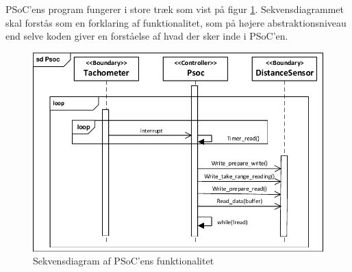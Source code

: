PSoC'ens program fungerer i store træk som vist på figur \ref{fig:sd_main_psoc}. Sekvensdiagrammet skal forstås som en forklaring af funktionalitet, som på højere abstraktionsniveau end selve koden giver en forståelse af hvad der sker inde i PSoC'en. 

\begin{figure}[h]
	\centering
	\includegraphics[]{../fig/diagrammer/psoc/sd_psoc.pdf}
	\caption{Sekvensdiagram af PSoC'ens funktionalitet}
	\label{fig:sd_main_psoc}
\end{figure}

\clearpage